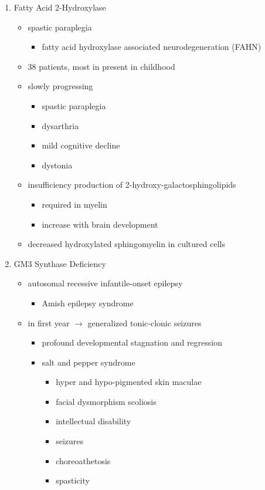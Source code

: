 \documentclass{scrartcl}
\begin{document}
\begin{enumerate}
\item Fatty Acid 2-Hydroxylase
\label{sec:org073e14c}

\begin{itemize}
\item spastic paraplegia
\begin{itemize}
\item fatty acid hydroxylase associated neurodegeneration (FAHN)
\end{itemize}
\item 38 patients, most in present in childhood
\item slowly progressing
\begin{itemize}
\item spastic paraplegia
\item dysarthria
\item mild cognitive decline
\item dystonia
\end{itemize}

\item insufficiency production of 2-hydroxy-galactosphingolipids
\begin{itemize}
\item required in myelin
\item increase with brain development
\end{itemize}

\item decreased hydroxylated sphingomyelin in cultured cells
\end{itemize}

\item GM3 Synthase Deficiency
\label{sec:org92d7cb2}

\begin{itemize}
\item autosomal recessive infantile-onset epilepsy
\begin{itemize}
\item Amish epilepsy syndrome
\end{itemize}
\item in first year \(\to\) generalized tonic-clonic seizures
\begin{itemize}
\item profound developmental stagnation and regression
\item salt and pepper syndrome
\begin{itemize}
\item hyper and hypo-pigmented skin maculae
\item facial dysmorphism scoliosis
\item intellectual disability
\item seizures
\item choreoathetosis
\item spasticity
\end{itemize}
\end{itemize}


\end{itemize}
\end{enumerate}
\end{document}

